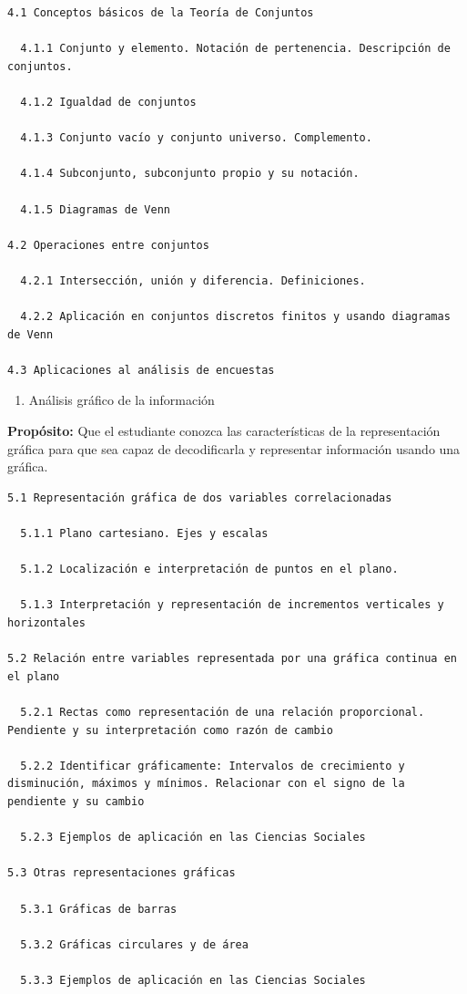 \documentclass[]{book}
\providecommand{\tightlist}{%
  \setlength{\itemsep}{0pt}\setlength{\parskip}{0pt}}
\begin{document}
\begin{verbatim}
4.1 Conceptos básicos de la Teoría de Conjuntos

  4.1.1 Conjunto y elemento. Notación de pertenencia. Descripción de conjuntos.

  4.1.2 Igualdad de conjuntos

  4.1.3 Conjunto vacío y conjunto universo. Complemento.

  4.1.4 Subconjunto, subconjunto propio y su notación.

  4.1.5 Diagramas de Venn

4.2 Operaciones entre conjuntos

  4.2.1 Intersección, unión y diferencia. Definiciones.

  4.2.2 Aplicación en conjuntos discretos finitos y usando diagramas de Venn

4.3 Aplicaciones al análisis de encuestas
\end{verbatim}

\begin{enumerate}
\def\labelenumi{\arabic{enumi}.}
\setcounter{enumi}{4}
\tightlist
\item
  Análisis gráfico de la información
\end{enumerate}

\textbf{Propósito:} Que el estudiante conozca las características de la
representación gráfica para que sea capaz de decodificarla y representar
información usando una gráfica.

\begin{verbatim}
5.1 Representación gráfica de dos variables correlacionadas

  5.1.1 Plano cartesiano. Ejes y escalas

  5.1.2 Localización e interpretación de puntos en el plano.

  5.1.3 Interpretación y representación de incrementos verticales y horizontales

5.2 Relación entre variables representada por una gráfica continua en el plano

  5.2.1 Rectas como representación de una relación proporcional. Pendiente y su interpretación como razón de cambio

  5.2.2 Identificar gráficamente: Intervalos de crecimiento y disminución, máximos y mínimos. Relacionar con el signo de la pendiente y su cambio

  5.2.3 Ejemplos de aplicación en las Ciencias Sociales

5.3 Otras representaciones gráficas

  5.3.1 Gráficas de barras

  5.3.2 Gráficas circulares y de área

  5.3.3 Ejemplos de aplicación en las Ciencias Sociales
\end{verbatim}
\end{document}
